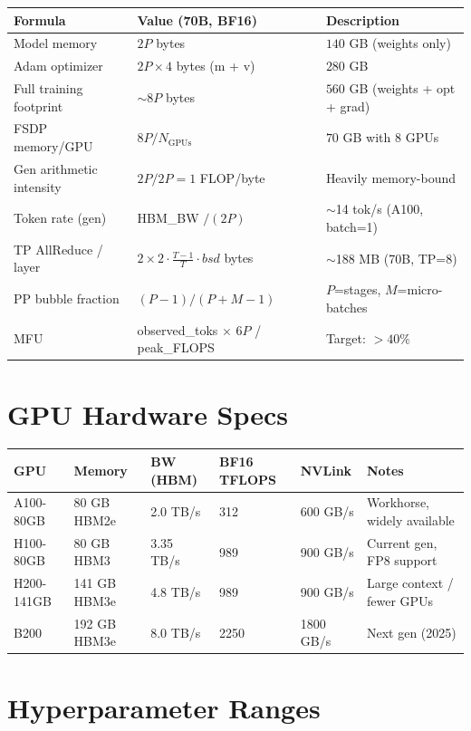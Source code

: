 \begin{tabular}{@{}lp{5cm}p{8cm}@{}}
\toprule
\textbf{Formula} & \textbf{Value (70B, BF16)} & \textbf{Description} \\
\midrule
Model memory & $2P$ bytes & $140$ GB (weights only) \\
Adam optimizer & $2P \times 4$ bytes (m + v) & $280$ GB \\
Full training footprint & $\sim 8P$ bytes & $560$ GB (weights + opt + grad) \\
FSDP memory/GPU & $8P / N_\text{GPUs}$ & $70$ GB with 8 GPUs \\
Gen arithmetic intensity & $2P / 2P = 1$ FLOP/byte & Heavily memory-bound \\
Token rate (gen) & HBM\_BW $/ (2P)$ & $\sim$14 tok/s (A100, batch=1) \\
TP AllReduce / layer & $2 \times 2 \cdot \frac{T-1}{T} \cdot bsd$ bytes & $\sim$188 MB (70B, TP=8) \\
PP bubble fraction & $(P-1)/(P+M-1)$ & $P$=stages, $M$=micro-batches \\
MFU & observed\_toks $\times$ 6$P$ / peak\_FLOPS & Target: $>40\%$ \\
\bottomrule
\end{tabular}

\section{GPU Hardware Specs}
\label{gpu-hardware-specs}

{\footnotesize
\begin{tabular}{@{}llllll@{}}
\toprule
\textbf{GPU} & \textbf{Memory} & \textbf{BW (HBM)} & \textbf{BF16 TFLOPS} & \textbf{NVLink} & \textbf{Notes} \\
\midrule
A100-80GB & 80 GB HBM2e & 2.0 TB/s & 312 & 600 GB/s & Workhorse, widely available \\
H100-80GB & 80 GB HBM3 & 3.35 TB/s & 989 & 900 GB/s & Current gen, FP8 support \\
H200-141GB & 141 GB HBM3e & 4.8 TB/s & 989 & 900 GB/s & Large context / fewer GPUs \\
B200 & 192 GB HBM3e & 8.0 TB/s & 2250 & 1800 GB/s & Next gen (2025) \\
\bottomrule
\end{tabular}
}

\section{Hyperparameter Ranges}
\label{hyperparameter-ranges}

